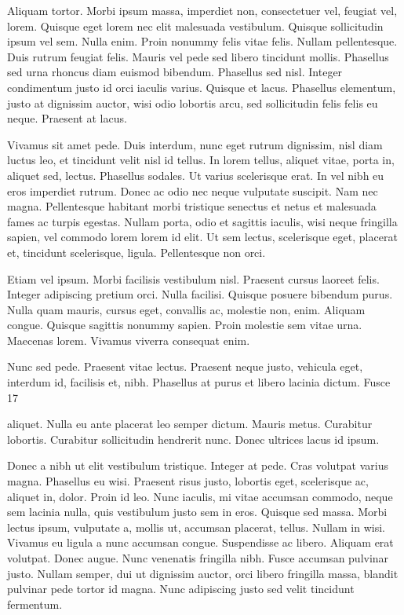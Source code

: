 \documentclass{article}
\begin{document}
Aliquam tortor. Morbi ipsum massa, imperdiet non, consectetuer vel, feugiat
vel, lorem. Quisque eget lorem nec elit malesuada vestibulum. Quisque
sollicitudin ipsum vel sem. Nulla enim. Proin nonummy felis vitae felis. Nullam
pellentesque. Duis rutrum feugiat felis. Mauris vel pede sed libero tincidunt
mollis. Phasellus sed urna rhoncus diam euismod bibendum. Phasellus sed nisl.
Integer condimentum justo id orci iaculis varius. Quisque et lacus. Phasellus
elementum, justo at dignissim auctor, wisi odio lobortis arcu, sed sollicitudin
felis felis eu neque. Praesent at lacus.

Vivamus sit amet pede. Duis interdum, nunc eget rutrum dignissim, nisl diam
luctus leo, et tincidunt velit nisl id tellus. In lorem tellus, aliquet vitae,
porta in, aliquet sed, lectus. Phasellus sodales. Ut varius scelerisque erat.
In vel nibh eu eros imperdiet rutrum. Donec ac odio nec neque vulputate
suscipit. Nam nec magna. Pellentesque habitant morbi tristique senectus et
netus et malesuada fames ac turpis egestas. Nullam porta, odio et sagittis
iaculis, wisi neque fringilla sapien, vel commodo lorem lorem id elit. Ut sem
lectus, scelerisque eget, placerat et, tincidunt scelerisque, ligula.
Pellentesque non orci.

Etiam vel ipsum. Morbi facilisis vestibulum nisl. Praesent cursus laoreet
felis. Integer adipiscing pretium orci. Nulla facilisi. Quisque posuere
bibendum purus. Nulla quam mauris, cursus eget, convallis ac, molestie non,
enim. Aliquam congue. Quisque sagittis nonummy sapien. Proin molestie sem vitae
urna. Maecenas lorem. Vivamus viverra consequat enim.

Nunc sed pede. Praesent vitae lectus. Praesent neque justo, vehicula eget,
interdum id, facilisis et, nibh. Phasellus at purus et libero lacinia dictum.
Fusce 17

aliquet. Nulla eu ante placerat leo semper dictum. Mauris metus. Curabitur
lobortis. Curabitur sollicitudin hendrerit nunc. Donec ultrices lacus id ipsum.

Donec a nibh ut elit vestibulum tristique. Integer at pede. Cras volutpat
varius magna. Phasellus eu wisi. Praesent risus justo, lobortis eget,
scelerisque ac, aliquet in, dolor. Proin id leo. Nunc iaculis, mi vitae
accumsan commodo, neque sem lacinia nulla, quis vestibulum justo sem in eros.
Quisque sed massa. Morbi lectus ipsum, vulputate a, mollis ut, accumsan
placerat, tellus. Nullam in wisi. Vivamus eu ligula a nunc accumsan congue.
Suspendisse ac libero. Aliquam erat volutpat. Donec augue. Nunc venenatis
fringilla nibh. Fusce accumsan pulvinar justo. Nullam semper, dui ut dignissim
auctor, orci libero fringilla massa, blandit pulvinar pede tortor id magna.
Nunc adipiscing justo sed velit tincidunt fermentum.
\end{document}
